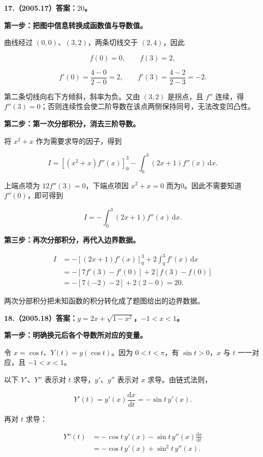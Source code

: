 \documentclass[UTF8,11pt,fontset=windows]{ctexart}
\begin{document}
\clearpage

\textbf{17.（2005.17）答案：$20$。}

\textbf{第一步：把图中信息转换成函数值与导数值。}

曲线经过 $(0,0)$、$(3,2)$，两条切线交于 $(2,4)$，因此

$$
f(0)=0,\qquad f(3)=2,
$$

$$
f'(0)=\frac{4-0}{2-0}=2,
\qquad f'(3)=\frac{4-2}{2-3}=-2.
$$

第二条切线向右下方倾斜，斜率为负。又由 $(3,2)$ 是拐点，且 $f''$ 连续，得 $f''(3)=0$；否则连续性会使二阶导数在该点两侧保持同号，无法改变凹凸性。

\textbf{第二步：第一次分部积分，消去三阶导数。}

将 $x^2+x$ 作为需要求导的因子，得到

$$
I=[(x^2+x)f''(x)]_0^3-\int_0^3(2x+1)f''(x)\,\mathrm dx.
$$

上端点项为 $12f''(3)=0$，下端点项因 $x^2+x=0$ 而为0。因此不需要知道 $f''(0)$，即可得到

$$
I=-\int_0^3(2x+1)f''(x)\,\mathrm dx.
$$

\textbf{第三步：再次分部积分，再代入边界数据。}

$$
\begin{aligned}
I&=-[(2x+1)f'(x)]_0^3+2\int_0^3 f'(x)\,\mathrm dx\\
 &=-[7f'(3)-f'(0)]+2[f(3)-f(0)]\\
 &=-[7(-2)-2]+2(2-0)=\boxed{20}.
\end{aligned}
$$

两次分部积分把未知函数的积分转化成了题图给出的边界数据。

\clearpage

\textbf{18.（2005.18）答案：$y=2x+\sqrt{1-x^2}$，$-1<x<1$。}

\textbf{第一步：明确换元后各个导数所对应的变量。}

令 $x=\cos t$、$Y(t)=y(\cos t)$。因为 $0<t<\pi$，有 $\sin t>0$，$x$ 与 $t$ 一一对应，且 $-1<x<1$。

以下 $Y'$、$Y''$ 表示对 $t$ 求导，$y'$、$y''$ 表示对 $x$ 求导。由链式法则，

$$
Y'(t)=y'(x)\frac{\mathrm dx}{\mathrm dt}
=-\sin t\,y'(x).
$$

再对 $t$ 求导：

$$
\begin{aligned}
Y''(t)
&=-\cos t\,y'(x)-\sin t\,y''(x)\frac{\mathrm dx}{\mathrm dt}\\
&=-\cos t\,y'(x)+\sin^2t\,y''(x).
\end{aligned}
$$
\end{document}
